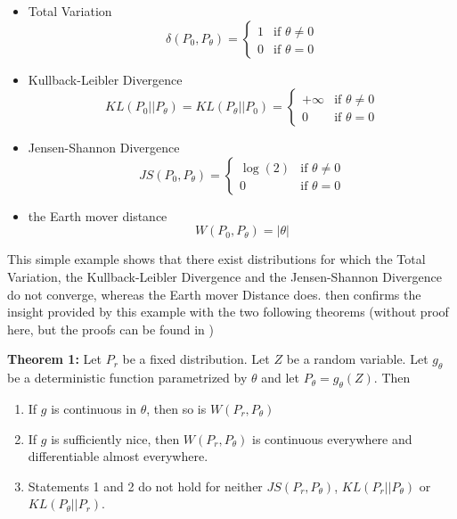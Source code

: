 \documentclass[11pt,a4paper,twoside]{report}
\begin{document}
\begin{itemize}
    \item Total Variation
    \begin{equation}
        \delta(P_0, P_{\theta}) = 
        \begin{cases}
            1 & \text{if } \theta \neq 0\\
            0 & \text{if } \theta = 0
        \end{cases}
    \end{equation}
    \item Kullback-Leibler Divergence
    \begin{equation}
        KL(P_0 || P_{\theta}) = KL(P_{\theta} || P_0) =
        \begin{cases}
            +\infty & \text{if } \theta \neq 0\\
            0 & \text{if } \theta = 0
        \end{cases}
    \end{equation}
    \item Jensen-Shannon Divergence  
    \begin{equation}
        JS(P_0, P_{\theta}) = 
        \begin{cases}
            \log(2) & \text{if } \theta \neq 0\\
            0 & \text{if } \theta = 0
        \end{cases}
    \end{equation}
    \item the Earth mover distance
    \begin{equation}
        W(P_0, P_{\theta}) = |\theta|
    \end{equation}
\end{itemize}

This simple example shows that there exist distributions for which the Total Variation, the Kullback-Leibler Divergence and the Jensen-Shannon Divergence do not converge, whereas the Earth mover Distance does. \cite{arjovsky2017wasserstein} then confirms the insight provided by this example with the two following theorems (without proof here, but the proofs can be found in \cite{arjovsky2017wasserstein})

\textbf{Theorem 1:} Let $P_r$ be a fixed distribution. Let $Z$ be a random variable. Let $g_{\theta}$ be a deterministic function parametrized by $\theta$ and let $P_{\theta} = g_{\theta}(Z)$. Then

\begin{enumerate}
    \item If $g$ is continuous in $\theta$, then so is $W(P_r, P_{\theta})$
    \item If $g$ is sufficiently nice, then $W(P_r, P_{\theta})$ is continuous everywhere and differentiable almost everywhere.
    \item Statements 1 and 2 do not hold for neither $JS(P_r, P_{\theta})$, $KL(P_r||P_{\theta})$ or $KL(P_{\theta}||P_r)$.
\end{enumerate}
\end{document}
